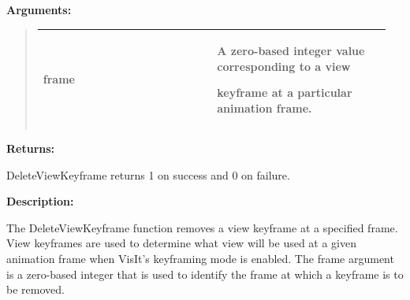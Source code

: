 \documentclass[letterpaper,10pt,english]{sphinxmanual}
\begin{document}
\begin{DUlineblock}{0em}
\item[] 
\item[] \textbf{Arguments:}
\end{DUlineblock}
\begin{quote}

\begin{tabular}{|p{0.475\linewidth}|p{0.475\linewidth}|}
\hline

frame
 & 
\begin{DUlineblock}{0em}
\item[] A zero-based integer value corresponding to a view
\item[] keyframe at a particular animation frame.
\end{DUlineblock}
\\
\hline\end{tabular}

\end{quote}

\begin{DUlineblock}{0em}
\item[] 
\item[] \textbf{Returns:}
\item[] DeleteViewKeyframe returns 1 on success and 0 on failure.
\item[] 
\item[] \textbf{Description:}
\item[] The DeleteViewKeyframe function removes a view keyframe at a specified
frame. View keyframes are used to determine what view will be used at a
given animation frame when VisIt's keyframing mode is enabled. The frame
argument is a zero-based integer that is used to identify the frame at
which a keyframe is to be removed.
\end{DUlineblock}

\begin{DUlineblock}{0em}
\item[] 
\end{DUlineblock}
\end{document}
